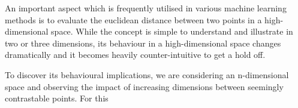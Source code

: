 An important aspect which is frequently utilised in various machine learning methods is to evaluate the euclidean distance between two points in a high-dimensional space.
While the concept is simple to understand and illustrate in two or three dimensions, its behaviour in a high-dimensional space changes dramatically and it becomes heavily counter-intuitive to get a hold off.

To discover its behavioural implications, we are considering an n-dimensional space and observing the impact of increasing dimensions between seemingly contrastable points. 
For this 
